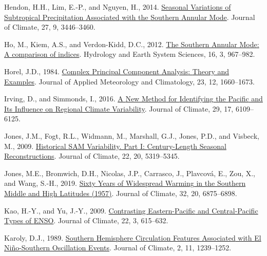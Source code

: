 \documentclass[12pt,oneside]{reedthesis}
\newlength{\cslhangindent}
\newenvironment{CSLReferences}[2] %
 {%
  \setlength{\parindent}{0pt}
  \ifodd #1 \everypar{\setlength{\hangindent}{\cslhangindent}}\ignorespaces\fi
  \ifnum #2 > 0
  \setlength{\parskip}{#2\baselineskip}
  \fi
 }%
 {}
\begin{document}
\begin{CSLReferences}{1}{0}
\leavevmode{}%
Hendon, H.H., Lim, E.-P., and Nguyen, H., 2014. \href{https://doi.org/10.1175/JCLI-D-13-00550.1}{Seasonal {Variations} of {Subtropical Precipitation Associated} with the {Southern Annular Mode}}. Journal of Climate, 27, 9, 3446--3460.

\leavevmode{}%
Ho, M., Kiem, A.S., and Verdon-Kidd, D.C., 2012. \href{https://doi.org/10.5194/hess-16-967-2012}{The {Southern Annular Mode}: A comparison of indices}. Hydrology and Earth System Sciences, 16, 3, 967--982.

\leavevmode{}%
Horel, J.D., 1984. \href{https://doi.org/10.1175/1520-0450(1984)023\%3C1660:CPCATA\%3E2.0.CO;2}{Complex {Principal Component Analysis}: {Theory} and {Examples}}. Journal of Applied Meteorology and Climatology, 23, 12, 1660--1673.

\leavevmode{}%
Irving, D., and Simmonds, I., 2016. \href{https://doi.org/10.1175/JCLI-D-15-0843.1}{A {New Method} for {Identifying} the {Pacific} and {Its Influence} on {Regional Climate Variability}}. Journal of Climate, 29, 17, 6109--6125.

\leavevmode{}%
Jones, J.M., Fogt, R.L., Widmann, M., Marshall, G.J., Jones, P.D., and Visbeck, M., 2009. \href{https://doi.org/10.1175/2009JCLI2785.1}{Historical {SAM Variability}. {Part I}: {Century-Length Seasonal Reconstructions}}. Journal of Climate, 22, 20, 5319--5345.

\leavevmode{}%
Jones, M.E., Bromwich, D.H., Nicolas, J.P., Carrasco, J., Plavcová, E., Zou, X., and Wang, S.-H., 2019. \href{https://doi.org/10.1175/JCLI-D-18-0565.1}{Sixty {Years} of {Widespread Warming} in the {Southern Middle} and {High Latitudes} (1957)}. Journal of Climate, 32, 20, 6875--6898.

\leavevmode{}%
Kao, H.-Y., and Yu, J.-Y., 2009. \href{https://doi.org/10.1175/2008JCLI2309.1}{Contrasting {Eastern-Pacific} and {Central-Pacific Types} of {ENSO}}. Journal of Climate, 22, 3, 615--632.

\leavevmode{}%
Karoly, D.J., 1989. \href{https://doi.org/10.1175/1520-0442(1989)002\%3C1239:SHCFAW\%3E2.0.CO;2}{Southern {Hemisphere Circulation Features Associated} with {El Niño-Southern Oscillation Events}}. Journal of Climate, 2, 11, 1239--1252.


\end{CSLReferences}
\end{document}
